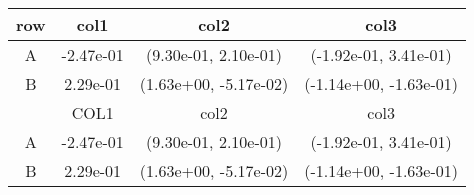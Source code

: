 \begin{tabular}{cccc}
\toprule
row&col1&col2&col3\tabularnewline
\midrule
A&-2.47e-01& (9.30e-01, 2.10e-01)& (-1.92e-01, 3.41e-01)\tabularnewline
B&2.29e-01& (1.63e+00, -5.17e-02)& (-1.14e+00, -1.63e-01)\tabularnewline
\midrule
&COL1&col2&col3\tabularnewline
\midrule
A&-2.47e-01& (9.30e-01, 2.10e-01)& (-1.92e-01, 3.41e-01)\tabularnewline
B&2.29e-01& (1.63e+00, -5.17e-02)& (-1.14e+00, -1.63e-01)\tabularnewline
\bottomrule
\end{tabular}
